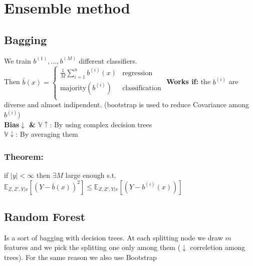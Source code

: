 \section{Ensemble method}

\subsection*{Bagging}
We train $b^{(1)}, \dots, b^{(M)}$ different classifiers. \\
Then \(\bar{b}(x)=
\begin{cases}
	\frac{1}{M}\sum_{i = 1}^n b^{(i)}(x) & \text{regression}\\
	\text{majority}\left(b^{(i)}\right)  & \text{classification}\\
\end{cases}\)
\textbf{Works if:} the $b^{(i)}$ are diverse and almost indipendent.
(bootstrap is used to reduce Covariance among $b^{(i)}$)\\
\textbf{Bias$\downarrow$ \& $\mathbb{V} \uparrow$}: By using complex decision trees\\
\textbf{$\mathbb{V}\downarrow$}: By averaging them
\subsubsection{Theorem:}
if $|y|<\infty$ then $\exists M$ large enough s.t.\\
$\mathbb{E}_{Z,Z',Y|x}\left[(Y-\bar{b}(x))^2\right]\leq \mathbb{E}_{Z,Z',Y|x}\left[(Y-b^{(i)}(x))\right]$

\subsection*{Random Forest}
Is a sort of bagging with decision trees. 
At each splitting node we draw $m$ features and we pick the splitting one only among them ($\downarrow$ correletion among trees). 
For the same reason we also use Bootstrap 

